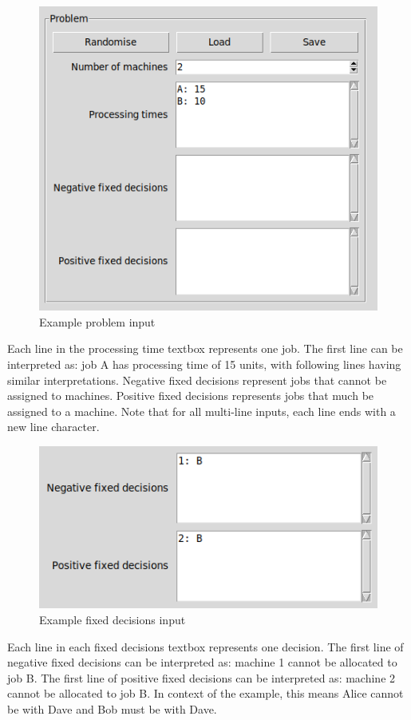 \begin{figure}[H]
	\centering
	\includegraphics[scale=0.5]{figures/tool_problem.png}
	\caption{Example problem input}
\end{figure}

Each line in the processing time textbox represents one job. The first line can be interpreted as: job A has processing time of 15 units, with following lines having similar interpretations. Negative fixed decisions represent jobs that cannot be assigned to machines. Positive fixed decisions represents jobs that much be assigned to a machine. Note that for all multi-line inputs, each line ends with a new line character.

\begin{figure}[H]
	\centering
	\includegraphics[scale=0.5]{figures/tool_fd.png}
	\caption{Example fixed decisions input}
\end{figure}

Each line in each fixed decisions textbox represents one decision. The first line of negative fixed decisions can be interpreted as: machine 1 cannot be allocated to job B. The first line of positive fixed decisions can be interpreted as: machine 2 cannot be allocated to job B. In context of the example, this means Alice cannot be with Dave and Bob must be with Dave.

